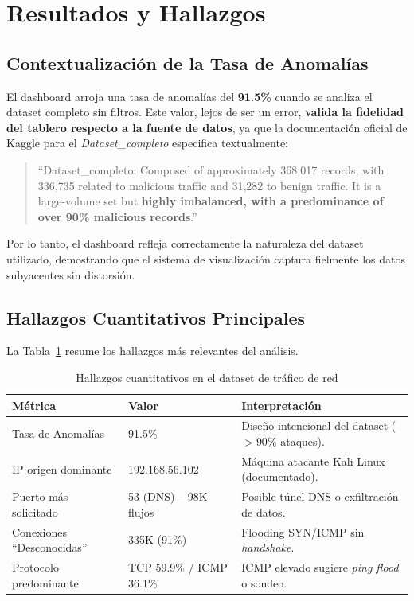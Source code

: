 \documentclass[conference]{IEEEtran}
\begin{document}
\section{Resultados y Hallazgos}

\subsection{Contextualizaci\'on de la Tasa de Anomal\'ias}
El dashboard arroja una tasa de anomal\'ias del \textbf{91.5\%} cuando se analiza el dataset completo sin filtros. Este valor, lejos de ser un error, \textbf{valida la fidelidad del tablero respecto a la fuente de datos}, ya que la documentaci\'on oficial de Kaggle para el \textit{Dataset\_completo} especifica textualmente:

\begin{quote}
``Dataset\_completo: Composed of approximately 368,017 records, with 336,735 related to malicious traffic and 31,282 to benign traffic. It is a large-volume set but \textbf{highly imbalanced, with a predominance of over 90\% malicious records}.'' \cite{kaggle_dataset}
\end{quote}

Por lo tanto, el dashboard refleja correctamente la naturaleza del dataset utilizado, demostrando que el sistema de visualizaci\'on captura fielmente los datos subyacentes sin distorsi\'on.

\subsection{Hallazgos Cuantitativos Principales}
La Tabla~\ref{tab:insights} resume los hallazgos m\'as relevantes del an\'alisis.

\begin{table}[h]
\centering
\caption{Hallazgos cuantitativos en el dataset de tr\'afico de red}
\label{tab:insights}
\begin{tabular}{p{2.3cm}p{1.7cm}p{3.8cm}}
\toprule
\textbf{M\'etrica} & \textbf{Valor} & \textbf{Interpretaci\'on} \\
\midrule
Tasa de Anomal\'ias & 91.5\% & Dise\~no intencional del dataset ($>90\%$ ataques). \\ \addlinespace
IP origen dominante & 192.168.56.102 & M\'aquina atacante Kali Linux (documentado). \\ \addlinespace
Puerto m\'as solicitado & 53 (DNS) -- 98K flujos & Posible t\'unel DNS o exfiltraci\'on de datos. \\ \addlinespace
Conexiones ``Desconocidas'' & 335K (91\%) & Flooding SYN/ICMP sin \textit{handshake}. \\ \addlinespace
Protocolo predominante & TCP 59.9\% / ICMP 36.1\% & ICMP elevado sugiere \textit{ping flood} o sondeo. \\
\bottomrule
\end{tabular}
\end{table}
\end{document}
